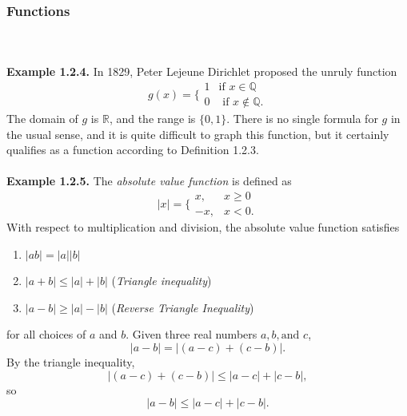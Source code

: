 \documentclass{article}
\begin{document}
\subsubsection{Functions}
        \\ \\
        \textbf{Example 1.2.4.} In 1829, Peter Lejeune Dirichlet proposed the unruly function
        \begin{equation*}
            g(x) = \bigg\{ \begin{matrix}1 & \text{if } x \in \mathbb{Q} \\ 0 & \text{ if } x \notin \mathbb{Q}. \end{matrix}
        \end{equation*}
        The domain of $g$ is $\mathbb{R}$, and the range is $\{0,1\}$. There is no single formula for $g$ in the usual sense, and it is quite difficult to graph this function, but it certainly qualifies as a function according to Definition 1.2.3.\\ \\
        \textbf{Example 1.2.5.} The \textit{absolute value function} is defined as
        \begin{equation*}
            |x| = \bigg\{ \begin{matrix}x, & x \geq 0 \\ -x, & x<0.\end{matrix}
        \end{equation*}
        With respect to multiplication and division, the absolute value function satisfies
        \begin{enumerate}
            \item $|ab| = |a||b|$
            \item $|a+b| \leq |a| + |b|$ (\textit{Triangle inequality})
            \item $|a-b| \geq |a| - |b|$ (\textit{Reverse Triangle Inequality})
        \end{enumerate}
        for all choices of $a$ and $b$. Given three real numbers $a,b, \text{and } c$,
        \begin{equation*}
            |a - b| = |(a - c) + (c - b)|.
        \end{equation*}
        By the triangle inequality,
        \begin{equation*}
            |(a - c) + (c - b)| \leq |a - c| + |c - b|,
        \end{equation*}
        so
        \begin{equation}
            |a - b| \leq |a - c| + |c - b|.
        \end{equation}
    
\end{document}
